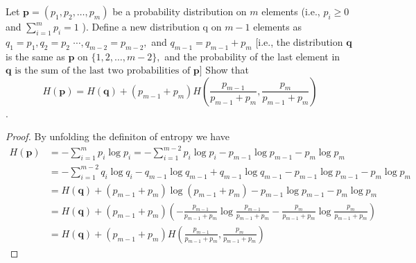 \begin{exercise}{Let $\mathbf{p}=\left(p_{1}, p_{2}, \ldots, p_{m}\right)$ be a probability distribution on $m$ elements (i.e., $p_{i} \geq 0$ and $\sum_{i=1}^{m} p_{i}=1$ ). Define a new distribution q on $m-1$ elements as $q_{1}=p_{1}, q_{2}=p_{2}$ $\cdots, q_{m-2}=p_{m-2},$ and $q_{m-1}=p_{m-1}+p_{m}$ [i.e., the distribution $\mathbf{q}$ is the same as $\mathbf{p}$ on $\{1,2, \ldots, m-2\},$ and the probability of the last element in $\mathbf{q} \text { is the sum of the last two probabilities of } \mathbf{p}]$ Show that
\begin{equation}H(\mathbf{p})=H(\mathbf{q})+\left(p_{m-1}+p_{m}\right) H\left(\frac{p_{m-1}}{p_{m-1}+p_{m}}, \frac{p_{m}}{p_{m-1}+p_{m}}\right)\end{equation}
  }.
  \begin{proof}
    By unfolding the definiton of entropy we have
    \begin{equation}\begin{aligned}
      H(\mathbf{p}) &=-\sum_{i=1}^{m} p_{i} \log p_{i} =-\sum_{i=1}^{m-2} p_{i}\log p_{i}-p_{m-1} \log p_{m-1}-p_{m} \log p_{m} \\
      &=-\sum_{i=1}^{m-2} q_{i} \log q_{i}-q_{m-1} \log q_{m-1}+ q_{m-1} \log q_{m-1} -p_{m-1} \log p_{m-1}-p_{m} \log p_{m} \\
      &= H(\mathbf{q}) + (p_{m-1}+p_{m}) \log (p_{m-1}+p_{m}) -p_{m-1} \log p_{m-1}-p_{m} \log p_{m} \\
      &= H(\mathbf{q})+\left(p_{m-1}+p_{m}\right)\left(- \frac{p_{m-1}}{p_{m-1}+p_{m}} \log \frac{p_{m-1}}{p_{m-1}+p_{m}} - \frac{p_{m}}{p_{m-1}+p_{m}} \log \frac{p_{m}}{p_{m-1}+p_{m}} \right) \\
      &=H(\mathbf{q})+\left(p_{m-1}+p_{m}\right) H\left(\frac{p_{m-1}}{p_{m-1}+p_{m}}, \frac{p_{m}}{p_{m-1}+p_{m}}\right)
      \end{aligned}\end{equation}
  \end{proof}
  \label{ex31-2}
\end{exercise}

